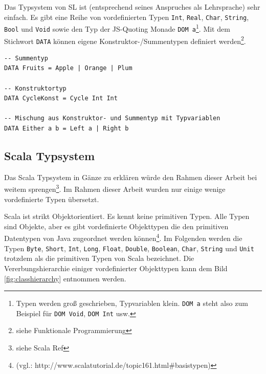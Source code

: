 \documentclass[12pt]{scrreprt}
\begin{document}
Das Typsystem von \ac{SL} ist (entsprechend seines Anspruches als Lehrsprache) sehr einfach. Es gibt eine Reihe von vordefinierten Typen \lstinline!Int!, \lstinline!Real!, \lstinline!Char!, \lstinline!String!, \lstinline!Bool! und \lstinline!Void! sowie den Typ der \ac{JS}-Quoting Monade \lstinline!DOM a!\footnote{Typen werden groß geschrieben, Typvariablen klein. \lstinline!DOM a! steht also zum Beispiel für \lstinline!DOM Void!, \lstinline!DOM Int! usw.}. Mit dem Stichwort \lstinline!DATA! können eigene Konstruktor-/Summentypen definiert werden\footnote{siehe Funktionale Programmierung}.

\begin{lstlisting}[caption=Beispiele für selbstdefinierte Datentypen in \ac{SL}, label=lst:bsp2]
-- Summentyp
DATA Fruits = Apple | Orange | Plum

-- Konstruktortyp
DATA CycleKonst = Cycle Int Int

-- Mischung aus Konstruktor- und Summentyp mit Typvariablen
DATA Either a b = Left a | Right b
\end{lstlisting}

\subsection{Scala Typsystem}

Das Scala Typsystem in Gänze zu erklären würde den Rahmen dieser Arbeit bei weitem sprengen\footnote{siehe Scala Ref}. Im Rahmen dieser Arbeit wurden nur einige wenige vordefinierte Typen übersetzt.

Scala ist strikt Objektorientiert. Es kennt keine primitiven Typen. Alle Typen sind Objekte, aber es gibt vordefinierte Objekttypen die den primitiven Datentypen von Java zugeordnet werden können\footnote{ (vgl.: http://www.scalatutorial.de/topic161.html\#basistypen)}. Im Folgenden werden die Typen \lstinline!Byte!, \lstinline!Short!, \lstinline!Int!, \lstinline!Long!, \lstinline!Float!, \lstinline!Double!, \lstinline!Boolean!, \lstinline!Char!, \lstinline!String! und \lstinline!Unit! trotzdem als die primitiven Typen von Scala bezeichnet. Die Vererbungshierarchie einiger vordefinierter Objekttypen kann dem Bild \ref{fig:classhierarchy} entnommen werden.
\end{document}
